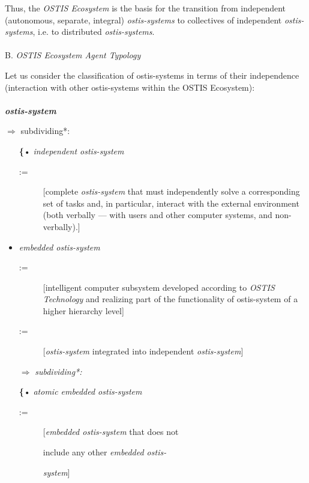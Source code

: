 \documentclass[a4paper,10pt]{article}
\begin{document}
\begin{multicols}{2}
Thus, the \textit{OSTIS Ecosystem} is the basis for the transition from independent (autonomous, separate, integral)
\textit{ostis-systems} to collectives of independent \textit{ostis-systems},
i.e. to distributed \textit{ostis-systems}.  \\ \\


\hspace{-0.5cm}B. \textit{OSTIS Ecosystem Agent Typology}


Let us consider the classification of ostis-systems in
terms of their independence (interaction with other ostis-systems within the OSTIS Ecosystem):\\ \\
\textbf{\textit{ostis-system}}

\hspace{-0.5cm}$\Rightarrow$ subdividing*: 
 \begin{itemize}
     \item [\textbf{\{}•] \textit{independent ostis-system}
     \begin{description}
        \item[:=] [complete \textit{ostis-system} that must independently solve a corresponding set of tasks
and, in particular, interact with the external
environment (both verbally — with users and
other computer systems, and non-verbally).]
    \end{description}
   \item \textit{embedded ostis-system}
   \begin{description}
        \item[:=] [intelligent computer subsystem developed according to \textit{OSTIS Technology} and realizing
part of the functionality of ostis-system of a
higher hierarchy level]
        \item[:=][\textit{ostis-system} integrated into independent \textit{ostis-system}]
    \end{description}

     $\Rightarrow$ \textit{subdividing*:}
     
\hspace{0.4cm} \textbf{\{}• \textit{atomic embedded ostis-system}
\begin{description}
        \item[\hspace{1cm}:=][\textit{embedded ostis-system} that does not
        \item[]\hspace{1.3cm} include any other \textit{embedded ostis-}
        \item[]\hspace{1.3cm} \textit{system}]
    \end{description}


\end{itemize}
\end{multicols}
\end{document}
